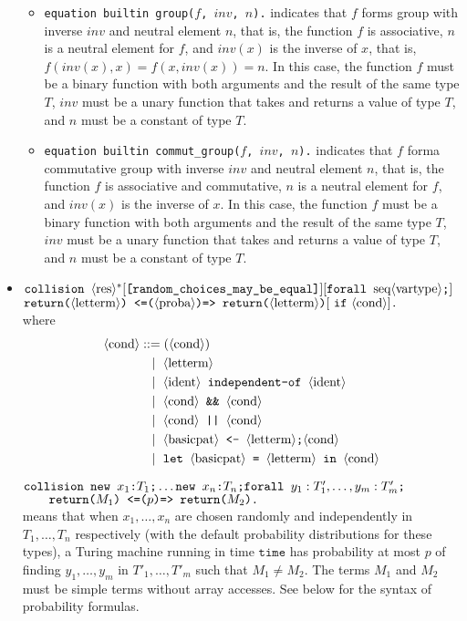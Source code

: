 \begin{itemize}
\begin{itemize}
\item \texttt{equation builtin group($f$, $inv$, $n$).} indicates that $f$ forms group with inverse $inv$ and neutral element $n$, that is, the function $f$ is associative, $n$ is a neutral element for $f$, and $inv(x)$ is the inverse of $x$, that is, $f(inv(x),x) = f(x,inv(x)) = n$. In this case, the function $f$ must be a binary function with both arguments and the result of the same type $T$, $inv$ must be a unary function that takes and returns a value of type $T$, and $n$ must be a constant of type $T$.

\item \texttt{equation builtin commut\_group($f$, $inv$, $n$).} indicates that $f$ forma commutative group with inverse $inv$ and neutral element $n$, that is, the function $f$ is associative and commutative, $n$ is a neutral element for $f$, and $inv(x)$ is the inverse of $x$. In this case, the function $f$ must be a binary function with both arguments and the result of the same type $T$, $inv$ must be a unary function that takes and returns a value of type $T$, and $n$ must be a constant of type $T$.

\end{itemize}

\item 
$\texttt{collision }\langle\textrm{res}\rangle^*
[\texttt{[random\_choices\_may\_be\_equal]}]
[\texttt{forall }\textrm{seq}\langle\textrm{vartype}\rangle\texttt{;}]$\\
\null\qquad $\texttt{return(}\langle\textrm{letterm}\rangle\texttt{) <=(}\langle\textrm{proba}\rangle\texttt{)=> return(}\langle\textrm{letterm}\rangle\texttt{)}
[\ \texttt{if}\ \langle\textrm{cond}\rangle]\texttt{.}$\\
where
\begin{align*}
\langle\textrm{cond}\rangle &::= (\langle\textrm{cond}\rangle)\\
&\ \ \mid \ \langle\textrm{letterm}\rangle\\
&\ \ \mid \ \langle\textrm{ident}\rangle\texttt{ independent-of }\langle\textrm{ident}\rangle\\
&\ \ \mid \ \langle\textrm{cond}\rangle\texttt{ \&\& }\langle\textrm{cond}\rangle\\
&\ \ \mid \ \langle\textrm{cond}\rangle\texttt{ || }\langle\textrm{cond}\rangle\\
&\ \ \mid \ \langle\textrm{basicpat}\rangle \texttt{ <- } \langle\textrm{letterm}\rangle\texttt{;}\langle\textrm{cond}\rangle\\
&\ \ \mid \ \texttt{let } \langle\textrm{basicpat}\rangle \texttt{ = }\langle\textrm{letterm}\rangle\texttt{ in }\langle\textrm{cond}\rangle
\end{align*}

$\texttt{collision }\texttt{new\ }{x_1}\texttt{:}{T_1}\texttt{;}\ldots 
\texttt{new\ }{x_n}\texttt{:}{T_n}\texttt{;}
\texttt{forall }y_1:T'_1, \ldots, y_m:T'_m\texttt{;}$\\
$\null\qquad \texttt{return(}M_1\texttt{) <=(}p\texttt{)=> return(}M_2\texttt{).}$\\
means that when
$x_1, \ldots, x_n$ are chosen randomly 
and independently in $T_1, \ldots, T_n$ respectively (with the default probability distributions for these types), a Turing machine running in
time $\texttt{time}$ has probability at most $p$ of finding
$y_1, \ldots, y_m$ in $T'_1, \ldots, T'_m$ such that $M_1 \neq M_2$.
%
The terms $M_1$ and $M_2$ must be simple terms without array accesses.
See below for the syntax of probability formulas.


\end{itemize}
